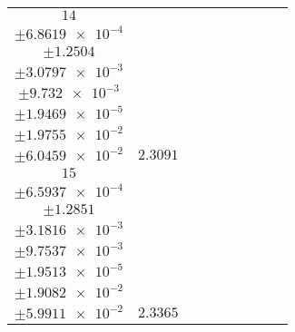 \documentclass[8pt]{article}
\begin{document}
\begin{longtable}[l]{c c c c c c c c c}
$\num{14}$ & \begin{tabular}[c]{@{}c@{}}$\num{3.0003e-2}$ \\ $\pm\num{6.8619e-4}$\end{tabular} & \begin{tabular}[c]{@{}c@{}}$\num{0.47394}$ \\ $\pm\num{1.2504}$\end{tabular} & \begin{tabular}[c]{@{}c@{}}$\num{-0.32052}$ \\ $\pm\num{3.0797e-3}$\end{tabular} & \begin{tabular}[c]{@{}c@{}}$\num{3.6263e+3}$ \\ $\pm\num{9.732e-3}$\end{tabular} & \begin{tabular}[c]{@{}c@{}}$\num{7.2546}$ \\ $\pm\num{1.9469e-5}$\end{tabular} & \begin{tabular}[c]{@{}c@{}}$\num{1.1857}$ \\ $\pm\num{1.9755e-2}$\end{tabular} & \begin{tabular}[c]{@{}c@{}}$\num{3.8913}$ \\ $\pm\num{6.0459e-2}$\end{tabular} & $\num{2.3091}$\\
$\num{15}$ & \begin{tabular}[c]{@{}c@{}}$\num{3.0397e-2}$ \\ $\pm\num{6.5937e-4}$\end{tabular} & \begin{tabular}[c]{@{}c@{}}$\num{0.44951}$ \\ $\pm\num{1.2851}$\end{tabular} & \begin{tabular}[c]{@{}c@{}}$\num{0.32031}$ \\ $\pm\num{3.1816e-3}$\end{tabular} & \begin{tabular}[c]{@{}c@{}}$\num{3.6269e+3}$ \\ $\pm\num{9.7537e-3}$\end{tabular} & \begin{tabular}[c]{@{}c@{}}$\num{7.2559}$ \\ $\pm\num{1.9513e-5}$\end{tabular} & \begin{tabular}[c]{@{}c@{}}$\num{1.1956}$ \\ $\pm\num{1.9082e-2}$\end{tabular} & \begin{tabular}[c]{@{}c@{}}$\num{3.9946}$ \\ $\pm\num{5.9911e-2}$\end{tabular} & $\num{2.3365}$\\

\end{longtable}
\end{document}
